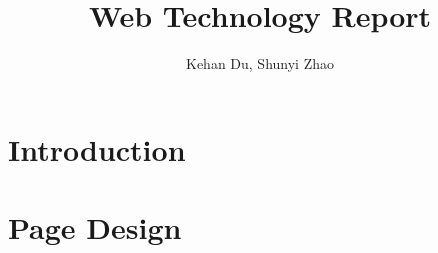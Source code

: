 \documentclass{article}
\title{Web Technology Report}
\author{Kehan Du, Shunyi Zhao}
\begin{document}
\maketitle

\section{Introduction}

\section{Page Design}



    
\end{document}
